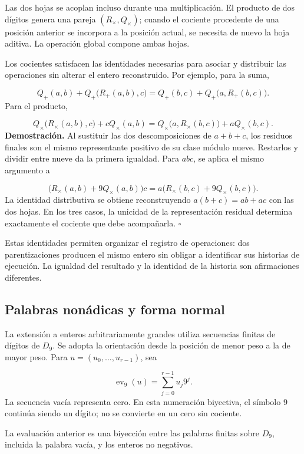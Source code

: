 Las dos hojas se acoplan incluso durante una multiplicación. El producto de dos dígitos genera una pareja $(R_\times,Q_\times)$; cuando el cociente procedente de una posición anterior se incorpora a la posición actual, se necesita de nuevo la hoja aditiva. La operación global compone ambas hojas.

Los cocientes satisfacen las identidades necesarias para asociar y distribuir las operaciones sin alterar el entero reconstruido. Por ejemplo, para la suma,

\[
Q_+(a,b)+Q_+\bigl(R_+(a,b),c\bigr)
=Q_+(b,c)+Q_+\bigl(a,R_+(b,c)\bigr).
\]
Para el producto,

\[
Q_\times\bigl(R_\times(a,b),c\bigr)+cQ_\times(a,b)
=Q_\times\bigl(a,R_\times(b,c)\bigr)+aQ_\times(b,c).
\]
\textbf{Demostración.} Al sustituir las dos descomposiciones de $a+b+c$, los residuos finales son el mismo representante positivo de su clase módulo nueve. Restarlos y dividir entre nueve da la primera igualdad. Para $abc$, se aplica el mismo argumento a

\[
\bigl(R_\times(a,b)+9Q_\times(a,b)\bigr)c
=a\bigl(R_\times(b,c)+9Q_\times(b,c)\bigr).
\]
La identidad distributiva se obtiene reconstruyendo $a(b+c)=ab+ac$ con las dos hojas. En los tres casos, la unicidad de la representación residual determina exactamente el cociente que debe acompañarla. \hfill\(\square\)

Estas identidades permiten organizar el registro de operaciones: dos parentizaciones producen el mismo entero sin obligar a identificar sus historias de ejecución. La igualdad del resultado y la identidad de la historia son afirmaciones diferentes.

\subsection{Palabras nonádicas y forma normal}
La extensión a enteros arbitrariamente grandes utiliza secuencias finitas de dígitos de $D_9$. Se adopta la orientación desde la posición de menor peso a la de mayor peso. Para $u=(u_0,\ldots,u_{r-1})$, sea

\[
\operatorname{ev}_9(u)=\sum_{j=0}^{r-1}u_j9^j.
\]
La secuencia vacía representa cero. En esta numeración biyectiva, el símbolo $9$ continúa siendo un dígito; no se convierte en un cero sin cociente.

La evaluación anterior es una biyección entre las palabras finitas sobre $D_9$, incluida la palabra vacía, y los enteros no negativos.

